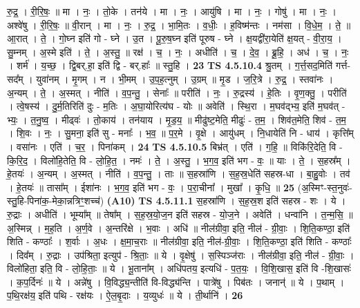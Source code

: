 \documentclass[17pt]{extarticle}
\begin{document}
                  रु॒द्र॒ । री॒रि॒षः॒ ॥ मा । नः॒ । तो॒के । तन॑ये । मा । नः॒ । आयु॑षि । मा । नः॒ । गोषु॑ । मा । नः॒ । अश्वे॑षु । री॒रि॒षः॒ ॥ वी॒रान् । मा । नः॒ । रु॒द्र॒ । भा॒मि॒तः । व॒धीः॒ । ह॒विष्म॑न्तः । नम॑सा । वि॒धे॒म॒ । ते॒ ॥ आ॒रात् । ते॒ । गो॒घ्न इति॑ गो - घ्ने । उ॒त । पू॒रु॒ष॒घ्न इति॑ पूरुष - घ्ने । क्ष॒यद्वी॑रा॒येति॑ क्ष॒यत् - वी॒रा॒य॒ । सु॒म्नम् । अ॒स्मे इति॑ । ते॒ । अ॒स्तु॒ ॥ रक्ष॑ । च॒ । नः॒ । अधीति॑ । च॒ । दे॒व॒ । ब्रू॒हि॒ । अध॑ । च॒ । नः॒ । शर्म॑ । य॒च्छ॒ । द्वि॒बर्.हा॒ इति॑ द्वि - बर्.हाः᳚ ॥ स्तु॒हि । \textbf{  23} \newline
                  \newline
                                \textbf{ TS 4.5.10.4} \newline
                  श्रु॒तम् । ग॒र्त्त॒सद॒मिति॑ गर्त्त-सद᳚म् । युवा॑नम् । मृ॒गम् । न । भी॒मम् । उ॒प॒ह॒त्नुम् । उ॒ग्रम् ॥ मृ॒ड । ज॒रि॒त्रे । रु॒द्र॒ । स्तवा॑नः । अ॒न्यम् । ते॒ । अ॒स्मत् । नीति॑ । व॒प॒न्तु॒ । सेनाः᳚ ॥ परीति॑ । नः॒ । रु॒द्रस्य॑ । हे॒तिः । वृ॒ण॒क्तु॒ । परीति॑ । त्वे॒षस्य॑ । दु॒र्म॒तिरिति॑ दुः - म॒तिः । अ॒घा॒योरित्य॑घ - योः ॥ अवेति॑ । स्थि॒रा । म॒घव॑द्भ्य॒ इति॑ म॒घव॑त् - भ्यः॒ । त॒नु॒ष्व॒ । मीढ्वः॑ । तो॒काय॑ । तन॑याय । मृ॒ड॒य॒ ॥ मीढु॑ष्ट॒मेति॒ मीढुः॑ - त॒म॒ । शिव॑त॒मेति॒ शिव॑ - त॒म॒ । शि॒वः । नः॒ । सु॒मना॒ इति॑ सु - मनाः᳚ । भ॒व॒ ॥ प॒र॒मे । वृ॒क्षे । आयु॑धम् । नि॒धायेति॑ नि - धाय॑ । कृत्ति᳚म् । वसा॑नः । एति॑ । च॒र॒ । पिना॑कम् । \textbf{  24} \newline
                  \newline
                                \textbf{ TS 4.5.10.5} \newline
                  बिभ्र॑त् । एति॑ । ग॒हि॒ ॥ विकि॑रि॒देति॒ वि - कि॒रि॒द॒ । विलो॑हि॒तेति॒ वि - लो॒हि॒त॒ । नमः॑ । ते॒ । अ॒स्तु॒ । भ॒ग॒व॒ इति॑ भग - वः॒ ॥ याः । ते॒ । स॒हस्र᳚म् । हे॒तयः॑ । अ॒न्यम् । अ॒स्मत् । नीति॑ । व॒प॒न्तु॒ । ताः ॥ स॒हस्रा॑णि । स॒ह॒स्र॒धेति॑ सहस्र-धा । बा॒हु॒वोः । तव॑ । हे॒तयः॑ ॥ तासा᳚म् । ईशा॑नः । भ॒ग॒व॒ इति॑ भग - वः॒ । प॒रा॒चीना᳚ । मुखा᳚ । कृ॒धि॒ ॥ \textbf{  25 } \newline
                  \newline
                      (अ॒स्मिꣳ-स्त॒नुवः॑-स्तु॒हि-पिना॑क॒-मेका॒न्नत्रिꣳ॒॒शच्च॑)  \textbf{(A10)} \newline \newline
                                \textbf{ TS 4.5.11.1} \newline
                  स॒हस्रा॑णि । स॒ह॒स्र॒श इति॑ सहस्र - शः । ये । रु॒द्राः । अधीति॑ । भूम्या᳚म् ॥ तेषा᳚म् । स॒ह॒स्र॒यो॒ज॒न इति॑ सहस्र - यो॒ज॒ने । अवेति॑ । धन्वा॑नि । त॒न्म॒सि॒ ॥ अ॒स्मिन्न् । म॒ह॒ति । अ॒र्ण॒वे । अ॒न्तरि॑क्षे । भ॒वाः । अधि॑ ॥ नील॑ग्रीवा॒ इति॒ नील॑ - ग्री॒वाः॒ । शि॒ति॒कण्ठा॒ इति॑ शिति - कण्ठाः᳚ । श॒र्वाः । अ॒धः । क्ष॒मा॒च॒राः ॥ नील॑ग्रीवा॒ इति॒ नील॑-ग्री॒वाः॒ । शि॒ति॒कण्ठा॒ इति॑ शिति - कण्ठाः᳚ । दिव᳚म् । रु॒द्राः । उप॑श्रिता॒ इत्युप॑ - श्रि॒ताः॒ ॥ ये । वृ॒क्षेषु॑ । स॒स्पिञ्ज॑राः । नील॑ग्रीवा॒ इति॒ नील॑ - ग्री॒वाः॒ । विलो॑हिता॒ इति॒ वि - लो॒हि॒ताः॒ ॥ ये । भू॒ताना᳚म् । अधि॑पतय॒ इत्यधि॑ - प॒त॒यः॒ । वि॒शि॒खास॒ इति॑ वि -शि॒खासः॑ । क॒प॒र्दिनः॑ ॥ ये । अन्ने॑षु । वि॒विद्ध्य॒न्तीति॑ वि-विद्ध्य॑न्ति । पात्रे॑षु । पिब॑तः । जनान्॑ ॥ ये । प॒थाम् । प॒थि॒रक्ष॑य॒ इति॑ पथि - रक्ष॑यः । ऐ॒ल॒बृ॒दाः । य॒व्युधः॑ ॥ ये । ती॒र्थानि॑ । \textbf{  26} \newline
\end{document}
